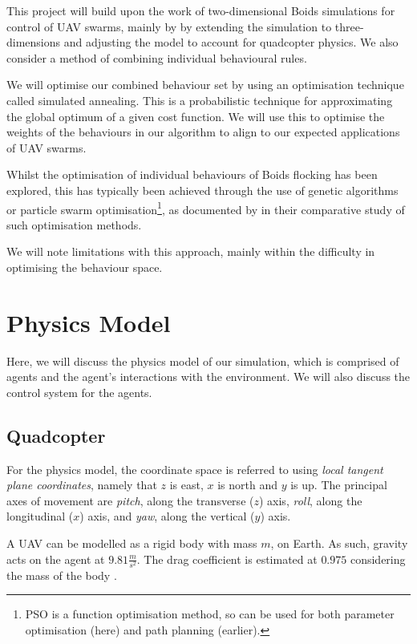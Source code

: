 \documentclass[12pt]{article}
\begin{document}
This project will build upon the work of two-dimensional Boids simulations for control of UAV swarms, mainly by \citet{madey2013design} by extending the simulation to three-dimensions and adjusting the model to account for quadcopter physics. We also consider a method of combining individual behavioural rules\cite{watson}.

We will optimise our combined behaviour set by using an optimisation technique called simulated annealing. This is a probabilistic technique for approximating the global optimum of a given cost function. We will use this to optimise the weights of the behaviours in our algorithm to align to our expected applications of UAV swarms. 

Whilst the optimisation of individual behaviours of Boids flocking has been explored, this has typically been achieved through the use of genetic algorithms or particle swarm optimisation\footnote{PSO is a function optimisation method, so can be used for both parameter optimisation (here) and path planning (earlier).}, as documented by \citet{Alaliyat2014OptimisationOB} in their comparative study of such optimisation methods.

We will note limitations with this approach, mainly within the difficulty in optimising the behaviour space.



\newpage
\section{Physics Model}
Here, we will discuss the physics model of our simulation, which is comprised of agents and the agent's interactions with the environment. We will also discuss the control system for the agents.
\subsection{Quadcopter}

For the physics model, the coordinate space is referred to using \emph{local tangent plane coordinates}, namely that $z$ is east, $x$ is north and $y$ is up. The principal axes of movement are \emph{pitch}, along the transverse ($z$) axis, \emph{roll}, along the longitudinal ($x$) axis, and \emph{yaw}, along the vertical ($y$) axis.

A UAV can be modelled as a rigid body with mass $m$, on Earth. As such, gravity acts on the agent at $9.81\frac{m}{s^2}$. The drag coefficient is estimated at $0.975$ considering the mass of the body \cite{Hattenberger}.
\end{document}
